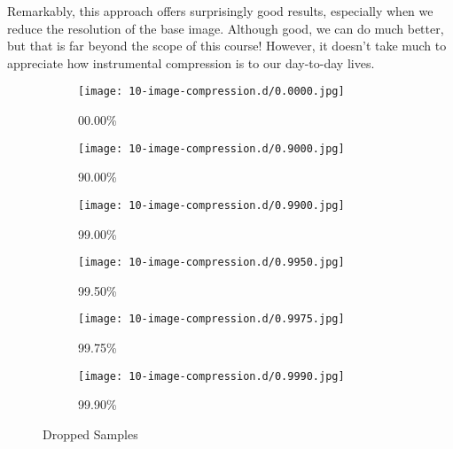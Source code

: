 \documentclass{article}
\begin{document}
Remarkably, this approach offers surprisingly good results, especially
when we reduce the resolution of the base image.  Although good, we can
do much better, but that is far beyond the scope of this course!
However, it doesn't take much to appreciate how instrumental compression
is to our day-to-day lives.

\begin{figure}[ht!]
	\begin{subfigure}{0.4\textwidth}
		\texttt{[image: 10-image-compression.d/0.0000.jpg]}
		\caption{00.00\%}
	\end{subfigure}
	\hfill
	\begin{subfigure}{0.4\textwidth}
		\texttt{[image: 10-image-compression.d/0.9000.jpg]}
		\caption{90.00\%}
	\end{subfigure}
	\hfill
	\begin{subfigure}{0.4\textwidth}
		\texttt{[image: 10-image-compression.d/0.9900.jpg]}
		\caption{99.00\%}
	\end{subfigure}
	\hfill
	\begin{subfigure}{0.4\textwidth}
		\texttt{[image: 10-image-compression.d/0.9950.jpg]}
		\caption{99.50\%}
	\end{subfigure}
	\hfill
	\begin{subfigure}{0.4\textwidth}
		\texttt{[image: 10-image-compression.d/0.9975.jpg]}
		\caption{99.75\%}
	\end{subfigure}
	\hfill
	\begin{subfigure}{0.4\textwidth}
		\texttt{[image: 10-image-compression.d/0.9990.jpg]}
		\caption{99.90\%}
	\end{subfigure}
	\caption{Dropped Samples}
\end{figure}
\end{document}
